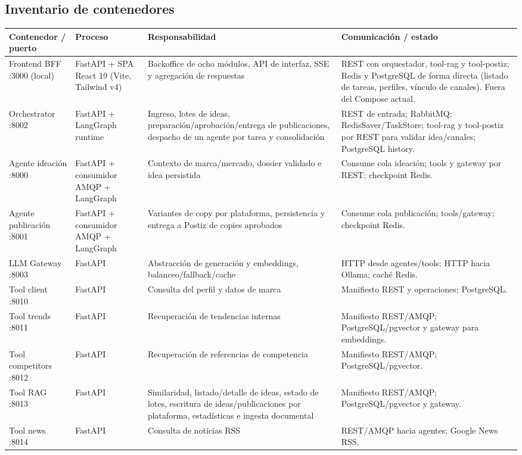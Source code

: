 \documentclass[12pt,oneside]{report}
\begin{document}
\subsection{Inventario de contenedores}
\begin{longtable}{p{2.8cm}p{2.0cm}p{4.1cm}p{5.4cm}}
\toprule
Contenedor / puerto & Proceso & Responsabilidad & Comunicación / estado \\
\midrule
Frontend BFF :3000 (local) & FastAPI + SPA React 19 (Vite, Tailwind v4) & Backoffice de ocho módulos, API de interfaz, SSE y agregación de respuestas & REST con orquestador, tool-rag y tool-postiz; Redis y PostgreSQL de forma directa (listado de tareas, perfiles, vínculo de canales). Fuera del Compose actual. \\
Orchestrator :8002 & FastAPI + LangGraph runtime & Ingreso, lotes de ideas, preparación/aprobación/entrega de publicaciones, despacho de un agente por tarea y consolidación & REST de entrada; RabbitMQ; RedisSaver/TaskStore; tool-rag y tool-postiz por REST para validar idea/canales; PostgreSQL history. \\
Agente ideación :8000 & FastAPI + consumidor AMQP + LangGraph & Contexto de marca/mercado, dossier validado e idea persistida & Consume cola ideación; tools y gateway por REST; checkpoint Redis. \\
Agente publicación :8001 & FastAPI + consumidor AMQP + LangGraph & Variantes de copy por plataforma, persistencia y entrega a Postiz de copies aprobados & Consume cola publicación; tools/gateway; checkpoint Redis. \\
LLM Gateway :8003 & FastAPI & Abstracción de generación y embeddings, balanceo/fallback/cache & HTTP desde agentes/tools; HTTP hacia Ollama; caché Redis. \\
Tool client :8010 & FastAPI & Consulta del perfil y datos de marca & Manifiesto REST y operaciones; PostgreSQL. \\
Tool trends :8011 & FastAPI & Recuperación de tendencias internas & Manifiesto REST/AMQP; PostgreSQL/pgvector y gateway para embeddings. \\
Tool competitors :8012 & FastAPI & Recuperación de referencias de competencia & Manifiesto REST/AMQP; PostgreSQL/pgvector. \\
Tool RAG :8013 & FastAPI & Similaridad, listado/detalle de ideas, estado de lotes, escritura de ideas/publicaciones por plataforma, estadísticas e ingesta documental & Manifiesto REST/AMQP; PostgreSQL/pgvector y gateway. \\
Tool news :8014 & FastAPI & Consulta de noticias RSS & REST/AMQP hacia agentes; Google News RSS. \\

\end{longtable}
\end{document}
